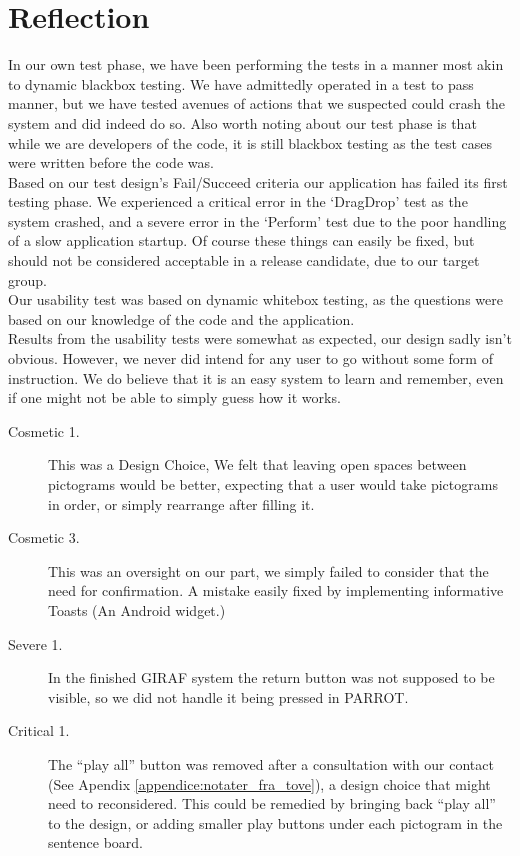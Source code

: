 \section{Reflection}
In our own test phase, we have been performing the tests in a manner most akin to dynamic blackbox testing.
We have admittedly operated in a test to pass manner, but we have tested avenues of actions that we suspected could crash the system and did indeed do so.
Also worth noting about our test phase is that while we are developers of the code, it is still blackbox testing as the test cases were written before the code was.\\
Based on our test design's Fail/Succeed criteria our application has failed its first testing phase.
We experienced a critical error in the `DragDrop' test as the system crashed, and a severe error in the `Perform' test due to the poor handling of a slow application startup.
Of course these things can easily be fixed, but should not be considered acceptable in a release candidate, due to our target group.\\

Our usability test was based on dynamic whitebox testing, as the questions were based on our knowledge of the code and the application.\\
Results from the usability tests were somewhat as expected, our design sadly isn't obvious.
However, we never did intend for any user to go without some form of instruction.
We do believe that it is an easy system to learn and remember, even if one might not be able to simply guess how it works.\\

\begin{description}
	\item[Cosmetic 1.] This was a Design Choice, We felt that leaving open spaces between pictograms would be better, expecting that a user would take pictograms in order, or simply rearrange after filling it.
	\item[Cosmetic 3.] This was an oversight on our part, we simply failed to consider that the need for confirmation. A mistake easily fixed by implementing informative Toasts (An Android widget.)
	\item[Severe 1.] In the finished GIRAF system the return button was not supposed to be visible, so we did not handle it being pressed in PARROT.
	\item[Critical 1.] The ``play all'' button was removed after a consultation with our contact (See Apendix \ref{appendice:notater_fra_tove}), a design choice that might need to reconsidered. This could be remedied by bringing back ``play all'' to the design, or adding smaller play buttons under each pictogram in the sentence board.  
\end{description}


